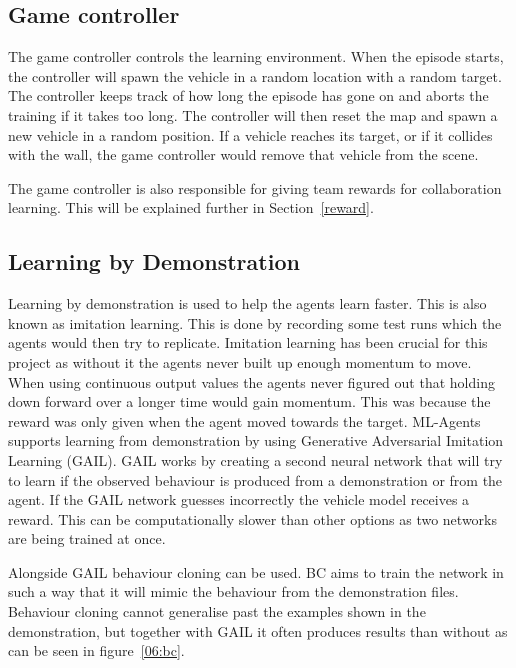 \subsection{Game controller}
The game controller controls the learning environment. When the episode starts, the controller will spawn the vehicle in a random location with a random target. The controller keeps track of how long the episode has gone on and aborts the training if it takes too long. The controller will then reset the map and spawn a new vehicle in a random position. If a vehicle reaches its target, or if it collides with the wall, the game controller would remove that vehicle from the scene.

The game controller is also responsible for giving team rewards for collaboration learning. This will be explained further in Section~\ref{reward}.

\subsection{Learning by Demonstration} \label{lbd}
Learning by demonstration is used to help the agents learn faster. This is also known as imitation learning. This is done by recording some test runs which the agents would then try to replicate. Imitation learning has been crucial for this project as without it the agents never built up enough momentum to move. When using continuous output values the agents never figured out that holding down forward over a longer time would gain momentum. This was because the reward was only given when the agent moved towards the target. ML-Agents supports learning from demonstration by using Generative Adversarial Imitation Learning (GAIL). GAIL works by creating a second neural network that will try to learn if the observed behaviour is produced from a demonstration or from the agent. If the GAIL network guesses incorrectly the vehicle model receives a reward. This can be computationally slower than other options as two networks are being trained at once. 

Alongside GAIL behaviour cloning can be used. BC aims to train the network in such a way that it will mimic the behaviour from the demonstration files. Behaviour cloning cannot generalise past the examples shown in the demonstration, but together with GAIL it often produces results than without as can be seen in figure~\ref{06:bc}. 

